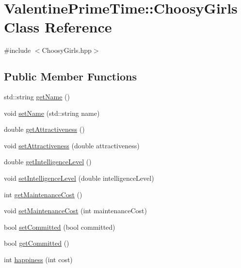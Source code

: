 \hypertarget{classValentinePrimeTime_1_1ChoosyGirls}{}\section{Valentine\+Prime\+Time\+:\+:Choosy\+Girls Class Reference}
\label{classValentinePrimeTime_1_1ChoosyGirls}


{\ttfamily \#include $<$Choosy\+Girls.\+hpp$>$}

\subsection*{Public Member Functions}
\begin{DoxyCompactItemize}
\item 
std\+::string \hyperlink{classValentinePrimeTime_1_1ChoosyGirls_a6e8b42b08f63636d9cc1a8fd8af7d63e}{get\+Name} ()
\item 
void \hyperlink{classValentinePrimeTime_1_1ChoosyGirls_abc756845333790093c4f04314c50c664}{set\+Name} (std\+::string name)
\item 
double \hyperlink{classValentinePrimeTime_1_1ChoosyGirls_a793d9df2721e7cd24be525e233fa5914}{get\+Attractiveness} ()
\item 
void \hyperlink{classValentinePrimeTime_1_1ChoosyGirls_aabad788987433fe203f266a0be8c0150}{set\+Attractiveness} (double attractiveness)
\item 
double \hyperlink{classValentinePrimeTime_1_1ChoosyGirls_a3cbaa935bd54662044bbbd6035d44829}{get\+Intelligence\+Level} ()
\item 
void \hyperlink{classValentinePrimeTime_1_1ChoosyGirls_aae2126bcc6463c16e5cb4e3438058eee}{set\+Intelligence\+Level} (double intelligence\+Level)
\item 
int \hyperlink{classValentinePrimeTime_1_1ChoosyGirls_a82dd83e4949f9edf51d34b85f2be1c51}{get\+Maintenance\+Cost} ()
\item 
void \hyperlink{classValentinePrimeTime_1_1ChoosyGirls_ac97b429b6ebad4e62ef0d0ba8924e4e7}{set\+Maintenance\+Cost} (int maintenance\+Cost)
\item 
bool \hyperlink{classValentinePrimeTime_1_1ChoosyGirls_ada01ddf2a9ea40f51b52a17e6788ba51}{set\+Committed} (bool committed)
\item 
bool \hyperlink{classValentinePrimeTime_1_1ChoosyGirls_ae80f0aeed3c98838b20f235a2091473a}{get\+Committed} ()
\item 
int \hyperlink{classValentinePrimeTime_1_1ChoosyGirls_a9f96e75633947da1a4a3c08d4132f015}{happiness} (int cost)
\end{DoxyCompactItemize}


